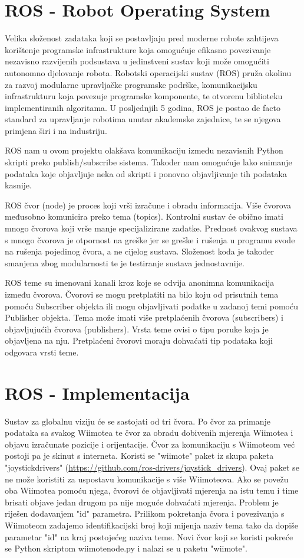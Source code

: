 \documentclass[times, utf8, diplomski]{fer}
\begin{document}
\section{ROS - Robot Operating System}
Velika složenost zadataka koji se postavljaju pred moderne robote zahtijeva korištenje programske infrastrukture koja omogućuje efikasno povezivanje nezavisno razvijenih podsustava u jedinstveni sustav koji može omogućiti autonomno djelovanje robota. Robotski operacijski sustav (ROS) pruža okolinu za razvoj modularne upravljačke programske podrške, komunikacijsku infrastrukturu koja povezuje programske komponente, te otvorenu biblioteku implementiranih algoritama. U posljednjih 5 godina, ROS je postao de facto standard za upravljanje robotima unutar akademske zajednice, te se njegova primjena širi i na industriju.

ROS nam u ovom projektu olakšava komunikaciju između nezavisnih Python skripti preko publish/subscribe sistema. Također nam omogućuje lako snimanje podataka koje objavljuje neka od skripti i ponovno objavljivanje tih podataka kasnije.

ROS čvor (node) je proces koji vrši izračune i obradu informacija. Više čvorova međusobno komunicira preko tema (topics). Kontrolni sustav će obično imati mnogo čvorova koji vrše manje specijalizirane zadatke. Prednost ovakvog sustava s mnogo čvorova je otpornost na greške jer se greške i rušenja u programu svode na rušenja pojedinog čvora, a ne cijelog sustava. Složenost koda je također smanjena zbog modularnosti te je testiranje sustava jednostavnije.

ROS teme su imenovani kanali kroz koje se odvija anonimna komunikacija između čvorova. Čvorovi se mogu pretplatiti na bilo koju od prisutnih tema pomoću Subscriber objekta ili mogu objavljivati podatke u zadanoj temi pomoću Publisher objekta. Tema može imati više pretplaćenih čvorova (subscribers) i objavljujućih čvorova (publishers). Vrsta teme ovisi o tipu poruke koja je objavljena na nju. Pretplaćeni čvorovi moraju dohvaćati tip podataka koji odgovara vrsti teme.

\section{ROS - Implementacija}
Sustav za globalnu viziju će se sastojati od tri čvora. Po čvor za primanje podataka sa svakog Wiimotea te čvor za obradu dobivenih mjerenja Wiimotea i objavu izračunate pozicije i orijentacije. Čvor za komunikaciju s Wiimoteom već postoji pa je skinut s interneta. Koristi se "wiimote" paket iz skupa paketa "joystick\textunderscore drivers" (\url{https://github.com/ros-drivers/joystick_drivers}). Ovaj paket se ne može koristiti za uspostavu komunikacije s više Wiimoteova. Ako se povežu oba Wiimotea pomoću njega, čvorovi će objavljivati mjerenja na istu temu i time brisati objave jedan drugom pa nije moguće dohvaćati mjerenja. Problem je riješen dodavanjem "id" parametra. Prilikom pokretanja čvora i povezivanja s Wiimoteom zadajemo identifikacijski broj koji mijenja naziv tema tako da dopiše parametar "id" na kraj postojećeg naziva teme. Novi čvor koji se koristi pokreće se Python skriptom wiimote\textunderscore node.py i nalazi se u paketu "wiimote".
\end{document}
